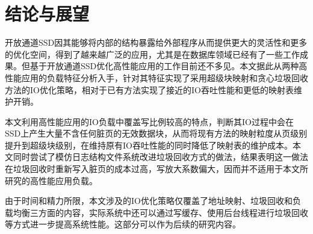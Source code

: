 \chapter{结论与展望}
\label{cha:conclusion}
开放通道SSD因其能够将内部的结构暴露给外部程序从而提供更大的灵活性和更多的优化空间，得到了越来越广泛的应用，尤其是在数据库领域已经有了一些工作成果。但基于开放通道SSD优化高性能应用的工作目前还不多见。本文据此从两种高性能应用的负载特征分析入手，针对其特征实现了采用超级块映射和贪心垃圾回收方法的IO优化策略，相对于已有方法实现了接近的IO吞吐性能和更低的映射表维护开销。

本文利用高性能应用的IO负载中覆盖写比例较高的特点，判断其IO过程中会在SSD上产生大量不含任何脏页的无效数据块，从而将现有方法的映射粒度从页级别提升到超级块级别，在维持原有IO吞吐性能的同时降低了映射表的维护成本。本文同时尝试了模仿日志结构文件系统改进垃圾回收方式的做法，结果表明这一做法在垃圾回收时重新写入脏页的成本过高，写放大系数偏大，因而并不适用于本文所研究的高性能应用负载。

由于时间和精力所限，本文涉及的IO优化策略仅覆盖了地址映射、垃圾回收和负载均衡三方面的内容，实际系统中还可以通过写缓存、使用后台线程进行垃圾回收等方式进一步提高系统性能。这部分可以作为后续的研究内容。